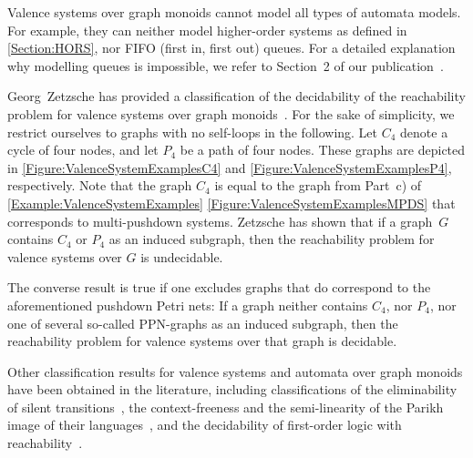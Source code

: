 \documentclass[../../diss.tex]{subfiles}
\begin{document}
Valence systems over graph monoids cannot model all types of automata models.
For example, they can neither model higher-order systems as defined in \cref{Section:HORS}, nor FIFO (first in, first out) queues.
For a detailed explanation why modelling queues is impossible, we refer to Section~2 of our publication~\cite{MeyerMZ18}.

Georg~Zetzsche has provided a classification of the decidability of the reachability problem for valence systems over graph monoids~\cite{Zetzsche15c}.
For the sake of simplicity, we restrict ourselves to graphs with no self-loops in the following.
Let $C_4$ denote a cycle of four nodes, and let $P_4$ be a path of four nodes.
These graphs are depicted in \cref{Figure:ValenceSystemExamplesC4} and \cref{Figure:ValenceSystemExamplesP4}, respectively.
Note that the graph $C_4$ is equal to the graph from Part~c) of \cref{Example:ValenceSystemExamples} \resp \cref{Figure:ValenceSystemExamplesMPDS} that corresponds to multi-pushdown systems.
Zetzsche has shown that if a graph~$G$ contains $C_4$ or $P_4$ as an induced subgraph, then the reachability problem for valence systems over $G$ is undecidable.

The converse result is true if one excludes graphs that do correspond to the aforementioned pushdown Petri nets: If a graph neither contains $C_4$, nor $P_4$, nor one of several so-called PPN-graphs as an induced subgraph, then the reachability problem for valence systems over that graph is decidable.

Other classification results for valence systems and automata over graph monoids have been obtained in the literature, including classifications of the eliminability of silent transitions~\cite{Zetzsche13}, the context-freeness and the semi-linearity of the Parikh image of their languages~\cite{BuckheisterZ13}, and the decidability of first-order logic with reachability~\cite{DOsualdoMZ16}.
\end{document}
